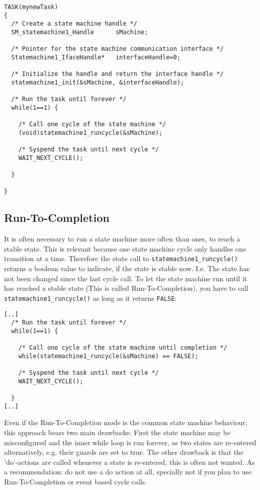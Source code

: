 \begin{verbatim}
TASK(mynewTask)
{
  /* Create a state machine handle */
  SM_statemachine1_Handle      sMachine;

  /* Pointer for the state machine communication interface */
  Statemachine1_IfaceHandle*   interfaceHandle=0;

  /* Initialize the handle and return the interface handle */
  statemachine1_init(&sMachine, &interfaceHandle);

  /* Run the task until forever */
  while(1==1) {

    /* Call one cycle of the state machine */
    (void)statemachine1_runcycle(&sMachine);
	
    /* Syspend the task until next cycle */
    WAIT_NEXT_CYCLE();

  }

}
\end{verbatim}

\subsection{Run-To-Completion}

It is often necessary to run a state machine more often than ones, to reach a
stable state. This is relevant because one state machine cycle only handles one
transition at a time. Therefore the state call to
\texttt{statemachine1\_runcycle()} returns a boolean value to indicate, if the
state is stable now. I.e. The state has not been changed since the last cycle
call. To let the state machine run until it has reached a stable state (This is
called Run-To-Completion), you have to call \texttt{statemachine1\_runcycle()} as
long as it returns \texttt{FALSE}:

\begin{verbatim}
[..]
  /* Run the task until forever */
  while(1==1) {

    /* Call one cycle of the state machine until completion */
    while(statemachine1_runcycle(&sMachine) == FALSE);
	
    /* Syspend the task until next cycle */
    WAIT_NEXT_CYCLE();

  }
[..]
\end{verbatim}

Even if the Run-To-Completion mode is the common state machine behaviour, this
approach bears two main drawbacks: First the state machine may be misconfigured
and the inner while loop is run forever, as two states are re-entered
alternatively, e.g. their guards are set to true. The other drawback is that the
'do'-actions are called whenever a state is re-entered, this is often not wanted.
As a recommendation: do not use a do action at all, specially not if you plan to
use Run-To-Completion or event based cycle calls.

